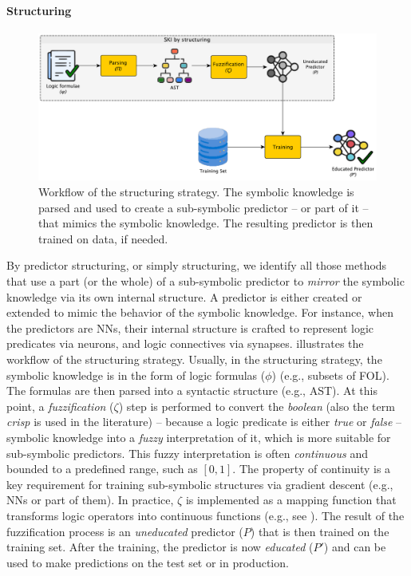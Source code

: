 \paragraph{Structuring}\label{par:structuring}
%
\begin{figure}
    \centering
    \includegraphics[width=.9\linewidth]{figures/workflow-structuring}
    \caption[SKI workflow of structuring strategy]{
        Workflow of the structuring strategy.
        The symbolic knowledge is parsed and used to create a sub-symbolic predictor -- or part of it -- that mimics the symbolic knowledge.
        The resulting predictor is then trained on data, if needed.
    }
    \label{fig:workflow-structuring}
\end{figure}
%
By predictor structuring, or simply structuring, we identify all those methods that use a part (or the whole) of a sub-symbolic predictor to \emph{mirror} the symbolic knowledge via its own internal structure.
%
A predictor is either created or extended to mimic the behavior of the symbolic knowledge.
%
For instance, when the predictors are \glspl{NN}, their internal structure is crafted to represent logic predicates via neurons, and logic connectives via synapses.
%
 illustrates the workflow of the structuring strategy.
%
Usually, in the structuring strategy, the symbolic knowledge is in the form of logic formulas ($\phi$) (e.g., subsets of \gls{FOL}).
%
The formulas are then parsed into a syntactic structure (e.g., \gls{AST}).
%
At this point, a \emph{fuzzification} ($\zeta$) step is performed to convert the \emph{boolean} (also the term \emph{crisp} is used in the literature) -- because a logic predicate is either \emph{true} or \emph{false} -- symbolic knowledge into a \emph{fuzzy} interpretation of it, which is more suitable for sub-symbolic predictors.
%
This fuzzy interpretation is often \emph{continuous} and bounded to a predefined range, such as \([0, 1]\).
%
The property of continuity is a key requirement for training sub-symbolic structures via gradient descent (e.g., \glspl{NN} or part of them).
%
In practice, $\zeta$ is implemented as a mapping function that transforms logic operators into continuous functions (e.g., see ).
%
The result of the fuzzification process is an \emph{uneducated} predictor ($P$) that is then trained on the training set.
%
After the training, the predictor is now \emph{educated} ($P'$) and can be used to make predictions on the test set or in production.
%

